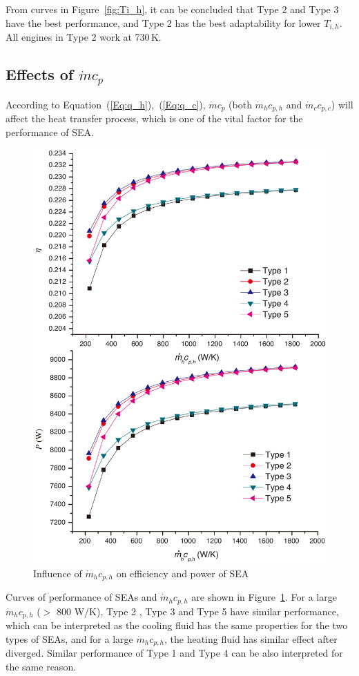 From curves in Figure~\ref{fig:Ti_h}, it can be concluded that Type 2 and Type 3 have the best performance, and Type 2 has the best adaptability for lower $T_{i,h}$. All engines in Type 2 work at 730\,K.

\subsection{Effects of $\dot{m}c_p$}

According to Equation~(\ref{Eq:q_h}),~(\ref{Eq:q_c}), $\dot{m}c_p$ (both $\dot{m}_hc_{p,h}$ and $\dot{m}_cc_{p,c}$) will affect the heat transfer process, which is one of the vital factor for the performance of SEA.


\noindent \begin{figure}[htbp]
\begin{center}
	\includegraphics[width = 0.7\columnwidth]{fig/qm_hcp_h}
	\caption{Influence of $\dot{m}_hc_{p,h}$ on efficiency and power of SEA}
	\label{fig:qm_hcp_h}
\end{center}
\end{figure}

Curves of performance of SEAs and $\dot{m}_hc_{p,h}$ are shown in Figure~\ref{fig:qm_hcp_h}.
For a large $\dot{m}_hc_{p,h}$ ($>$ 800 W/K), Type 2 , Type 3 and Type 5 have similar performance, which can be interpreted as the cooling fluid has the same properties for the two types of SEAs, and for a large $\dot{m}_hc_{p,h}$, the heating fluid has similar effect after diverged. Similar performance of Type 1 and Type 4 can be also interpreted for the same reason.

